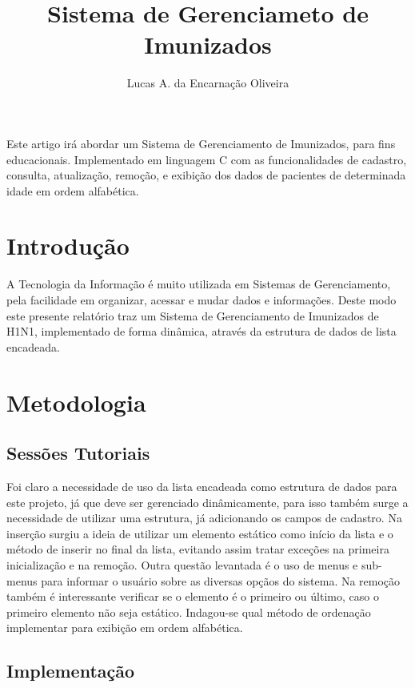 \documentclass[12pt]{article}
\title{Sistema de Gerenciameto de Imunizados}
\author{Lucas A. da Encarnação Oliveira\inst{1} }
\begin{document}
 

\maketitle
     
\begin{resumo} 
  Este artigo irá abordar um Sistema de Gerenciamento de Imunizados, para fins
  educacionais. Implementado em linguagem C com as funcionalidades de cadastro,
  consulta, atualização, remoção, e exibição dos dados de pacientes de determinada
  idade em ordem alfabética.
\end{resumo}


\section{Introdução}

A Tecnologia da Informação é muito utilizada em Sistemas de Gerenciamento,
pela facilidade em organizar, acessar e mudar dados e informações. Deste modo
este presente relatório traz um Sistema de Gerenciamento de Imunizados de H1N1, implementado
de forma dinâmica, através da estrutura de dados de lista encadeada.

\section{Metodologia} \label{sec:firstpage}
   

\subsection{Sessões Tutoriais}

Foi claro a necessidade de uso da lista encadeada como estrutura de dados
para este projeto, já que deve ser gerenciado dinâmicamente, para isso também
surge a necessidade de utilizar uma estrutura, já adicionando os campos de cadastro.
Na inserção surgiu a ideia de utilizar um elemento estático como início da lista
e o método de inserir no final da lista, evitando assim tratar exceções na primeira
inicialização e na remoção. Outra questão levantada é o uso de menus e sub-menus para
informar o usuário sobre as diversas opçãos do sistema. Na remoção também é interessante
verificar se o elemento é o primeiro ou último, caso o primeiro elemento não seja 
estático. Indagou-se qual método de ordenação implementar para exibição em
ordem alfabética.

\subsection{Implementação}
\end{document}
